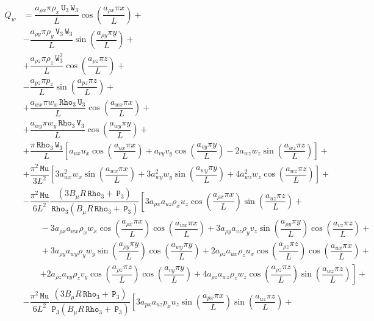 \documentclass[10pt]{article}
\newcommand{\Rho}{\,\mathtt{Rho}}
\newcommand{\PP}{\,\mathtt{P}}
\newcommand{\U}{\,\mathtt{U}}
\newcommand{\V}{\,\mathtt{V}}
\newcommand{\W}{\,\mathtt{W}}
\newcommand{\MU}{\,\mathtt{Mu}}
\begin{document}
\begin{equation}
 \begin{split}
Q_w &= \dfrac{a_{\rho x} \pi \rho_x \U_3 \W_3}{L} \cos\left(\dfrac{a_{\rho x} \pi x}{L}\right)+\\
&-\dfrac{a_{\rho y} \pi \rho_y \V_3 \W_3 }{L}\sin\left(\dfrac{a_{\rho y} \pi y}{L}\right)+\\
&+\dfrac{a_{\rho z} \pi \rho_z \W_3^2 }{L}\cos\left(\dfrac{a_{\rho z}\pi z }{L}\right)+\\
&-\dfrac{a_{pz} \pi p_z }{L}\sin\left(\dfrac{a_{pz}\pi z }{L}\right)+\\
&+\dfrac{a_{wx} \pi w_x \Rho_3 \U_3 }{L}\cos\left(\dfrac{a_{wx} \pi x}{L}\right)+\\
&+\dfrac{a_{wy} \pi w_y \Rho_3 \V_3}{L}\cos\left(\dfrac{a_{wy} \pi y}{L}\right) +\\
&+\dfrac{\pi \Rho_3 \W_3}{L}\left[a_{ux} u_x \cos\left(\dfrac{a_{ux} \pi x}{L}\right)+a_{vy} v_y \cos\left(\dfrac{a_{vy} \pi y}{L}\right)-2 a_{wz} w_z \sin\left(\dfrac{a_{wz}\pi z }{L}\right)\right]+\\
&+\dfrac{ \pi^2 \MU }{3L^2}  \left[3 a_{wx}^2 w_x \sin\left(\dfrac{a_{wx} \pi x}{L}\right)+3 a_{wy}^2 w_y \sin\left(\dfrac{a_{wy} \pi y}{L}\right)+4 a_{wz}^2 w_z \cos\left(\dfrac{a_{wz} \pi z}{L}\right)\right] +\\
%
&-\dfrac{ \pi^2 \MU }{6L^2}\dfrac{(3 B_\mu R \Rho_3+\PP_3) }{\Rho_3 (B_\mu R \Rho_3+\PP_3) } \left[3 a_{\rho x} a_{uz} \rho_x u_z \cos\left(\dfrac{a_{\rho x} \pi x}{L}\right) \sin\left(\dfrac{a_{uz} \pi z}{L}\right)+\right.\\
    &\qquad-3 a_{\rho x} a_{wx} \rho_x w_x \cos\left(\dfrac{a_{\rho x} \pi x}{L}\right) \cos\left(\dfrac{a_{wx} \pi x}{L}\right)+3 a_{\rho y} a_{vz} \rho_y v_z \sin\left(\dfrac{a_{\rho y} \pi y}{L}\right) \cos\left(\dfrac{a_{vz} \pi z}{L}\right)+\\
    &\qquad+3 a_{\rho y} a_{wy} \rho_y w_y \sin\left(\dfrac{a_{\rho y} \pi y}{L}\right) \cos\left(\dfrac{a_{wy} \pi y}{L}\right)+2 a_{\rho z} a_{ux} \rho_z u_x \cos\left(\dfrac{a_{\rho z} \pi z}{L}\right) \cos\left(\dfrac{a_{ux} \pi x}{L}\right)+\\
    &\qquad\left.+2 a_{\rho z} a_{vy} \rho_z v_y \cos\left(\dfrac{a_{\rho z} \pi z}{L}\right) \cos\left(\dfrac{a_{vy} \pi y}{L}\right)+4 a_{\rho z} a_{wz} \rho_z w_z \cos\left(\dfrac{a_{\rho z} \pi z}{L}\right) \sin\left(\dfrac{a_{wz} \pi z}{L}\right)\right] +\\
%
&-  \dfrac{ \pi^2 \MU }{6L^2}\dfrac{(3 B_\mu R \Rho_3+\PP_3)}{\PP_3  (B_\mu R \Rho_3+\PP_3) } \left[3 a_{px} a_{uz} p_x u_z \sin\left(\dfrac{a_{px} \pi x}{L}\right) \sin\left(\dfrac{a_{uz} \pi z}{L}\right)+\right.\\

\end{split}
\end{equation}
\end{document}
